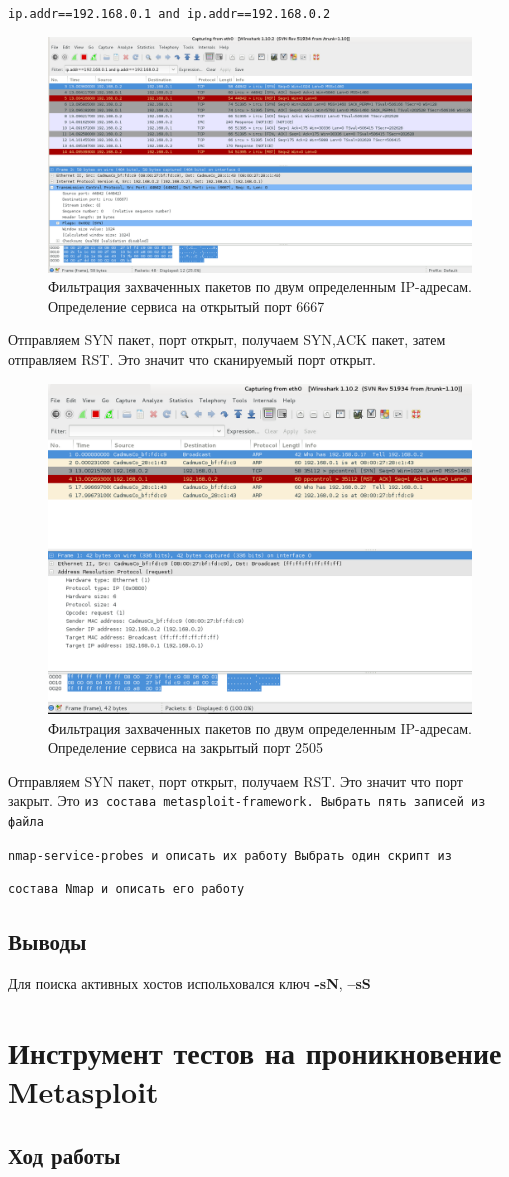 \documentclass[12pt,a4paper]{article}
\begin{document}
\verb+ip.addr==192.168.0.1 and ip.addr==192.168.0.2+
\FloatBarrier
\begin{figure}[h!]
\centering
\includegraphics[scale=0.3]{res/scan1}
\caption{Фильтрация захваченных пакетов по двум определенным IP-адресам. Определение сервиса на открытый порт 6667 }
\end{figure}
\FloatBarrier
Отправляем SYN пакет, порт открыт, получаем SYN,ACK пакет, затем отправляем RST. Это значит что сканируемый порт открыт.
\FloatBarrier
\begin{figure}[h!]
\centering
\includegraphics[scale=0.38]{res/scan2}
\caption{Фильтрация захваченных пакетов по двум определенным IP-адресам. Определение сервиса на закрытый порт 2505 }
\end{figure}
\FloatBarrier
Отправляем SYN пакет, порт открыт, получаем RST. Это значит что порт закрыт.
Это 
\verb+из состава metasploit-framework. Выбрать пять записей из файла+

\verb+nmap-service-probes и описать их работу Выбрать один скрипт из +

\verb+состава Nmap и описать его работу+
\subsection{Выводы}
Для поиска активных хостов испольховался ключ \textbf{-sN}, \textbf{--sS}
\section{Инструмент тестов на проникновение Metasploit}
\subsection{Ход работы}
\end{document}
